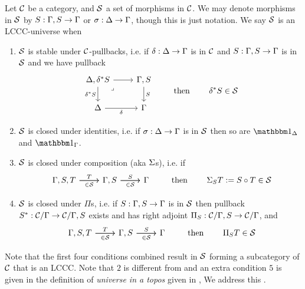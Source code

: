 \begin{dfn}
  Let $\mathcal{C}$ be a category, and $\mathcal{S}$ a set of morphisms in $\mathcal{C}$.
  We may denote morphisms in $\mathcal{S}$ by $S : \Gamma,S \to \Gamma$ or $\sigma : \Delta \to \Gamma$,
  though this is just notation.
  We say $\mathcal{S}$ is an LCCC-universe when
  \begin{enumerate}
    \item $\mathcal{S}$ is stable under $\mathcal{C}$-pullbacks,
          i.e. if $\delta : \Delta \to \Gamma$ is in $\mathcal{C}$ and $S : \Gamma,S \to \Gamma$ is in $\mathcal{S}$ and we have pullback
          \[\begin{tikzcd}
            {\De,\de^* S} & {\Ga,S} \\
            \De & \Ga
            \arrow["S", from=1-2, to=2-2]
            \arrow["{\de^* S}"', from=1-1, to=2-1]
            \arrow["\de"', from=2-1, to=2-2]
            \arrow[from=1-1, to=1-2]
            \arrow["\lrcorner"{anchor=center, pos=0.125}, draw=none, from=1-1, to=2-2]
          \end{tikzcd}
          \quad \quad \text{ then } \quad \quad \de^{*}S \in \SS\]
    \item $\mathcal{S}$ is closed under identities, i.e. if $\sigma : \Delta \to \Gamma$ is in $\mathcal{S}$ then
          so are $\id{\De}$ and $\id{\Ga}$.
    \item $\mathcal{S}$ is closed under composition (aka $\Sigma$s), i.e. if
          \[\begin{tikzcd}
              {\Ga,S,T} & {\Ga,S} & \Ga
              \arrow["T", from=1-1, to=1-2]
              \arrow["\in \SS"', from=1-1, to=1-2]
              \arrow["S", from=1-2, to=1-3]
              \arrow["\in \SS"', from=1-2, to=1-3]
            \end{tikzcd}
          \quad \quad \text{ then } \quad \quad \Si_{S} T := S \circ T \in \SS\]
    \item $\mathcal{S}$ is closed under $\Pi$s, i.e. if $S : \Gamma,S \to \Gamma$ is in $\mathcal{S}$
          then pullback $S^{*} : \mathcal{C} / \Gamma \to \mathcal{C} / \Gamma,S$ exists and has right
          adjoint $\Pi_{S} : \mathcal{C} / \Gamma,S \to \mathcal{C} / \Gamma$, and
            \[\begin{tikzcd}
              {\Ga,S,T} & {\Ga,S} & \Ga
              \arrow["T", from=1-1, to=1-2]
              \arrow["\in \SS"', from=1-1, to=1-2]
              \arrow["S", from=1-2, to=1-3]
              \arrow["\in \SS"', from=1-2, to=1-3]
            \end{tikzcd}
          \quad \quad \text{ then } \quad \quad \Pi_{S} T \in \SS\]
  \end{enumerate}

  Note that the first four conditions combined result in $\mathcal{S}$ forming a subcategory of $\mathcal{C}$ that is an LCCC.
  Note that $2$ is different from and an extra condition $5$ is given in
  the definition of \textit{universe in a topos} given in \cite{streicher},
  We address this .
\end{dfn}
